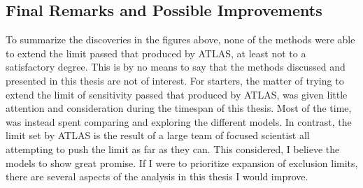 \subsection*{Final Remarks and Possible Improvements}
To summarize the discoveries in the figures above, none of the methods were able to extend the limit passed that produced by ATLAS, at least not to a satisfactory degree.
This is by no means to say that the methods discussed and presented in this thesis are not of interest. For starters, the matter of trying to extend the limit of sensitivity 
passed that produced by ATLAS, was given little attention and consideration during the timespan of this thesis. Most of the time, was instead spent comparing and exploring the 
different models. In contrast, the limit set by ATLAS is the result of a large team of focused scientist all attempting to push the limit as far as they can. This considered, I believe 
the models to show great promise. If I were to prioritize expansion of exclusion limits, there are several aspects of the analysis in this thesis I would improve.
